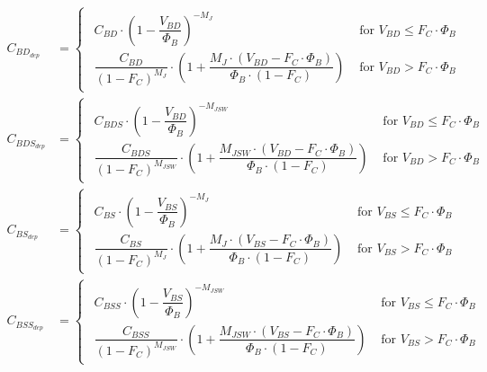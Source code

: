 \documentclass[10pt]{report}
\begin{document}
\begin{align}
C_{BD_{dep}} &= 
\begin{cases}
\begin{array}{ll}
C_{BD}\cdot \left(1 - \dfrac{V_{BD}}{\Phi_{B}}\right)^{-M_{J}} & \textrm{ for } V_{BD} \le F_{C}\cdot \Phi_{B}\\
\dfrac{C_{BD}}{\left(1 - F_{C}\right)^{M_{J}}}\cdot \left(1 + \dfrac{M_{J}\cdot \left(V_{BD} - F_{C}\cdot \Phi_{B}\right)}{\Phi_{B}\cdot \left(1 - F_{C}\right)}\right) & \textrm{ for } V_{BD} > F_{C}\cdot \Phi_{B}
\end{array}
\end{cases}\\
C_{BDS_{dep}} &= 
\begin{cases}
\begin{array}{ll}
C_{BDS}\cdot \left(1 - \dfrac{V_{BD}}{\Phi_{B}}\right)^{-M_{JSW}} & \textrm{ for } V_{BD} \le F_{C}\cdot \Phi_{B}\\
\dfrac{C_{BDS}}{\left(1 - F_{C}\right)^{M_{JSW}}}\cdot \left(1 + \dfrac{M_{JSW}\cdot \left(V_{BD} - F_{C}\cdot \Phi_{B}\right)}{\Phi_{B}\cdot \left(1 - F_{C}\right)}\right) & \textrm{ for } V_{BD} > F_{C}\cdot \Phi_{B}
\end{array}
\end{cases}\\
C_{BS_{dep}} &= 
\begin{cases}
\begin{array}{ll}
C_{BS}\cdot \left(1 - \dfrac{V_{BS}}{\Phi_{B}}\right)^{-M_{J}} & \textrm{ for } V_{BS} \le F_{C}\cdot \Phi_{B}\\
\dfrac{C_{BS}}{\left(1 - F_{C}\right)^{M_{J}}}\cdot \left(1 + \dfrac{M_{J}\cdot \left(V_{BS} - F_{C}\cdot \Phi_{B}\right)}{\Phi_{B}\cdot \left(1 - F_{C}\right)}\right) & \textrm{ for } V_{BS} > F_{C}\cdot \Phi_{B}
\end{array}
\end{cases}\\
C_{BSS_{dep}} &= 
\begin{cases}
\begin{array}{ll}
C_{BSS}\cdot \left(1 - \dfrac{V_{BS}}{\Phi_{B}}\right)^{-M_{JSW}} & \textrm{ for } V_{BS} \le F_{C}\cdot \Phi_{B}\\
\dfrac{C_{BSS}}{\left(1 - F_{C}\right)^{M_{JSW}}}\cdot \left(1 + \dfrac{M_{JSW}\cdot \left(V_{BS} - F_{C}\cdot \Phi_{B}\right)}{\Phi_{B}\cdot \left(1 - F_{C}\right)}\right) & \textrm{ for } V_{BS} > F_{C}\cdot \Phi_{B}
\end{array}
\end{cases}
\end{align}
\end{document}

